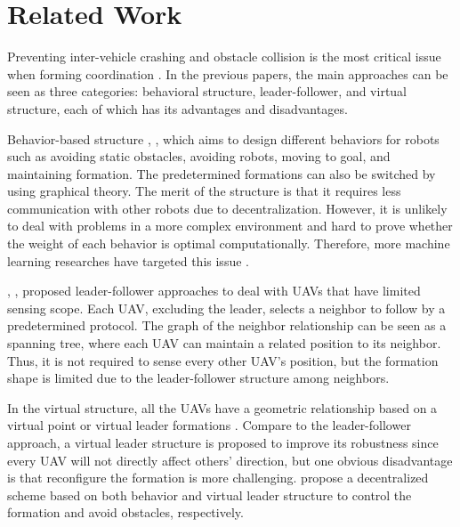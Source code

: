 \chapter{Related Work}

Preventing inter-vehicle crashing and obstacle collision is the most critical issue when forming coordination \citep{580977}. In the previous papers, the main approaches can be seen as three categories: behavioral structure, leader-follower, and virtual structure, each of which has its advantages and disadvantages.

Behavior-based structure \citep{balch1998behavior}, \citep{1261347}, which aims to design different behaviors for robots such as avoiding static obstacles, avoiding robots, moving to goal, and maintaining formation. The predetermined formations can also be switched by using graphical theory. The merit of the structure is that it requires less communication with other robots due to decentralization. However, it is unlikely to deal with problems in a more complex environment and hard to prove whether the weight of each behavior is optimal computationally. Therefore, more machine learning researches have targeted this issue \citep{bithas2019survey}.

\citet{tanner2004leader}, \citet{fredslund2002general}, \citet{luo2013uav} proposed leader-follower approaches to deal with UAVs that have limited sensing scope. Each UAV, excluding the leader, selects a neighbor to follow by a predetermined protocol. The graph of the neighbor relationship can be seen as a spanning tree, where each UAV can maintain a related position to its neighbor. Thus, it is not required to sense every other UAV's position, but the formation shape is limited due to the leader-follower structure among neighbors. 

In the virtual structure, all the UAVs have a geometric relationship based on a virtual point or virtual leader formations \citep{beard2001coordination}. Compare to the leader-follower approach, a virtual leader structure is proposed to improve its robustness since every UAV will not directly affect others' direction, but one obvious disadvantage is that reconfigure the formation is more challenging. \citet{6451251} propose a decentralized scheme based on both behavior and virtual leader structure to control the formation and avoid obstacles, respectively.

